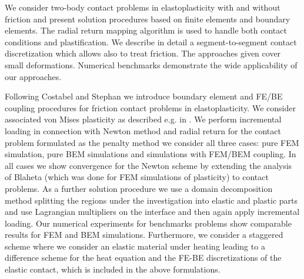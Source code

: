 We consider two-body contact problems in elastoplasticity with and without friction and present solution procedures based on finite elements and boundary elements. The radial return mapping algorithm is used to handle both contact conditions and plastification. We describe in detail a segment-to-segment contact discretization which allows also to treat friction. The approaches given cover small deformations. Numerical benchmarks demonstrate the wide applicability of our approaches.
\def \IABEM{/home/gein/Documents/tex/papers/IABEM06}
\def \SimulationDataOne{/home/gein/Documents/tex/Draft/contact.BEMBEM.vs.FEMFEM/SimulationData/test.plasticity.check.21.07.2006.test.bembem.nofriction.18.07.2006}
\def \pict{/home/gein/Documents/tex/papers/paper_FE.BE.Procedures.for.Elastoplastic.Contact.Problems_CGMS/pict}
\def \pictnew{/home/gein/Documents/tex/papers/paper_FE.BE.Procedures.for.Elastoplastic.Contact.Problems_CGMS/pict_new}
\def \convergence{/home/gein/Documents/tex/papers/paper_FE.BE.Procedures.for.Elastoplastic.Contact.Problems_CGMS/convergence}
\def \DomainDecomposition{/home/gein/Documents/tex/papers/paper_Domain.Decomposition.FE.BE.Techniques.for.Elastoplastic.Contact.Problems_CGMS}

Following Costabel and Stephan \cite{CoSt88,CoSt90}  we introduce  boundary element and FE/BE coupling procedures for friction contact problems in elastoplasticity. We consider associated von Mises plasticity as described e.g. in \cite{SiHu98}. We perform incremental loading in connection with Newton method and radial return for the contact problem formulated as the penalty method we consider all three cases: pure FEM simulation, pure BEM simulations and simulations with FEM/BEM coupling. In all cases we show convergence for the Newton scheme by extending the analysis of Blaheta \cite{Bl97} (which was done for FEM simulations of plasticity) to contact problems. As a further solution procedure we use a domain decomposition method splitting the regions under the investigation into elastic and plastic parts and use Lagrangian multipliers on the interface and then again apply incremental loading. Our numerical experiments for benchmarks problems show comparable results for FEM and BEM simulations. Furthermore, we consider a staggered scheme where we consider an elastic material under heating leading to a difference scheme for the heat equation and the FE-BE discretizations of the elastic contact, which is included in the above formulations.

